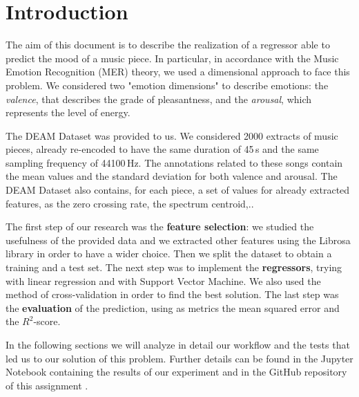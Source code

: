 \section{Introduction}

The aim of this document is to describe the realization of a regressor able to predict the mood of a music piece. In particular, in accordance with the Music Emotion Recognition (MER) theory, we used a dimensional approach to face this problem. We considered two "emotion dimensions" to describe emotions: the \emph{valence}, that describes the grade of pleasantness, and the \emph{arousal}, which represents the level of energy.

The DEAM Dataset was provided to us. We considered 2000 extracts of music pieces, already re-encoded to have the same duration of 45\,s and the same sampling frequency of 44100\,Hz. The annotations related to these songs contain the mean values and the standard deviation for both valence and arousal. The DEAM Dataset also contains, for each piece, a set of values for already extracted features, as the zero crossing rate, the spectrum centroid,..

The first step of our research was the \textbf{feature selection}: we studied the usefulness of the provided data and we extracted other features using the Librosa library in order to have a wider choice. Then we split the dataset to obtain a training and a test set. The next step was to implement the \textbf{regressors}, trying with linear regression and with Support Vector Machine. We also used the method of cross-validation in order to find the best solution. The last step was the \textbf{evaluation} of the prediction, using as metrics the mean squared error and the $R^2$-score.

In the following sections we will analyze in detail our workflow and the tests that led us to our solution of this problem. Further details can be found in the Jupyter Notebook containing the results of our experiment \cite{notebook} and in the GitHub repository of this assignment \cite{github}.

